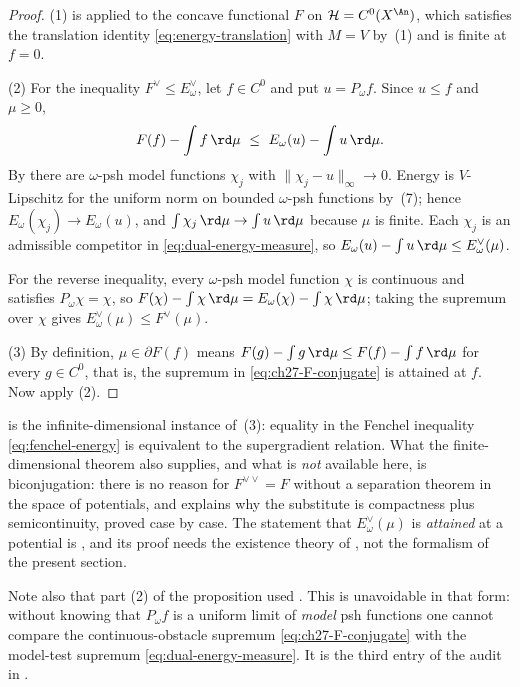\begin{proof}
(1) is  applied to the concave functional \(F\) on
\(\mathcal H=C^0(X^{\An})\), which satisfies the translation identity
\eqref{eq:energy-translation} with \(M=V\) by
\,(1) and is finite at \(f=0\).

(2) For the inequality \(F^\vee\leq E^\vee_\omega\), let \(f\in C^0\) and put
\(u=P_\omega f\).  Since \(u\leq f\) and \(\mu\geq0\),
\[
 F(f)-\int f\,\rd\mu\ \leq\ E_\omega(u)-\int u\,\rd\mu .
\]
By  there are \(\omega\)-psh model
functions \(\chi_j\) with \(\lVert\chi_j-u\rVert_\infty\to0\).  Energy is
\(V\)-Lipschitz for the uniform norm on bounded \(\omega\)-psh functions by
\,(7); hence
\(E_\omega(\chi_j)\to E_\omega(u)\), and
\(\int\chi_j\,\rd\mu\to\int u\,\rd\mu\) because \(\mu\) is finite.  Each
\(\chi_j\) is an admissible competitor in \eqref{eq:dual-energy-measure}, so
\(E_\omega(u)-\int u\,\rd\mu\leq E^\vee_\omega(\mu)\).

For the reverse inequality, every \(\omega\)-psh model function \(\chi\) is
continuous and satisfies \(P_\omega\chi=\chi\), so
\(F(\chi)-\int\chi\,\rd\mu=E_\omega(\chi)-\int\chi\,\rd\mu\); taking the
supremum over \(\chi\) gives \(E^\vee_\omega(\mu)\leq F^\vee(\mu)\).

(3) By definition, \(\mu\in\partial F(f)\) means
\(F(g)-\int g\,\rd\mu\leq F(f)-\int f\,\rd\mu\) for every \(g\in C^0\), that
is, the supremum in \eqref{eq:ch27-F-conjugate} is attained at \(f\).  Now
apply (2).
\end{proof}

\begin{remark}
\label{rem:ch27-legendre-picture}
 is the infinite-dimensional
instance of \,(3): equality in the Fenchel
inequality \eqref{eq:fenchel-energy} is equivalent to the supergradient
relation.  What the finite-dimensional theorem also supplies, and what is
\emph{not} available here, is biconjugation: there is no reason for
\(F^{\vee\vee}=F\) without a separation theorem in the space of potentials,
and  explains why the substitute is
compactness plus semicontinuity, proved case by case.  The statement that
\(E^\vee_\omega(\mu)\) is \emph{attained} at a potential is
, and its proof needs
the existence theory of , not the
formalism of the present section.

Note also that part (2) of the proposition used
.  This is unavoidable in that form:
without knowing that \(P_\omega f\) is a uniform limit of \emph{model} psh
functions one cannot compare the continuous-obstacle supremum
\eqref{eq:ch27-F-conjugate} with the model-test supremum
\eqref{eq:dual-energy-measure}.  It is the third entry of the audit in
.
\end{remark}

